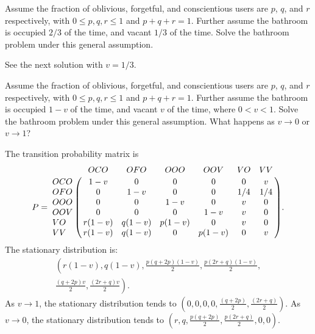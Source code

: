 \documentclass[12pt]{article}
\begin{document}
\begin{exercise}
    Assume the fraction of oblivious, forgetful, and conscientious users
    are \( p \), \( q \), and \( r \) respectively, with \( 0 \le p,q,r
    \le 1 \) and \( p + q + r = 1 \).  Further assume the bathroom is
    occupied \( 2/3 \) of the time, and vacant \( 1/3 \) of the time.
    Solve the bathroom problem under this general assumption.

\end{exercise}
\begin{solution}
    See the next solution with \( v = 1/3 \).
\end{solution}

\begin{exercise}
    Assume the fraction of oblivious, forgetful, and conscientious users
    are \( p \), \( q \), and \( r \) respectively, with \( 0 \le p,q,r
    \le 1 \) and \( p + q + r = 1 \).  Further assume the bathroom is
    occupied \( 1-v \) of the time, and vacant \( v \) of the time,
    where \( 0 < v < 1 \).  Solve the bathroom problem under this
    general assumption.  What happens as \( v \to 0 \) or \( v \to 1 \)?
\end{exercise}
\begin{solution}
    The transition probability matrix is
    \[
        P= \bordermatrix{ & OCO & OFO & OOO & OOV & VO & VV \cr
        OCO & 1-v & 0 & 0 & 0 & 0 & v \cr
        OFO & 0 & 1-v & 0 & 0 & 1/4 & 1/4 \cr
        OOO & 0 & 0 & 1-v & 0 & v & 0 \cr
        OOV & 0 & 0 & 0 & 1-v & v & 0 \cr
        VO & r(1-v) & q(1-v) & p(1-v) & 0 & v & 0 \cr
        VV & r(1-v) & q(1-v) & 0 & p(1-v) & 0 & v \cr
        }.
    \] The stationary distribution is:
    \begin{multline*}
        \left( r(1-v), q(1-v), \frac{p(q + 2p)(1-v)}{2}, \frac{p(2r + q)
        (1-v)}{2}, \right.\\
        \left.  \frac{(q + 2p)v}{2}, \frac{(2r + q)v}{2} \right).
    \end{multline*}
    As \( v \to 1 \), the stationary distribution tends to \( \left(0,
    0, 0, 0, \frac{(q + 2p)}{2}, \frac{(2r + q)}{2} \right) \).  As \( v
    \to 0 \), the stationary distribution tends to \( \left(r, q, \frac{p
    (q + 2p)}{2}, \frac{p(2r + q)}{2}, 0, 0 \right) \).
\end{solution}
\end{document}
